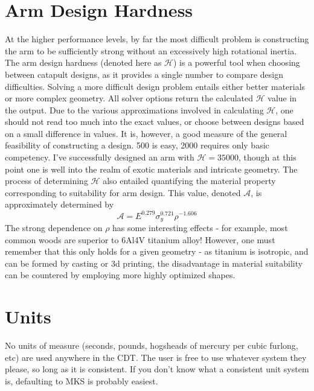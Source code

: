 \documentclass{article}
\begin{document}
\section{Arm Design Hardness}
 At the higher performance levels, by far the most difficult problem is constructing the arm to be sufficiently strong without an excessively high rotational inertia. The arm design hardness (denoted here as $\mathcal{H}$) is a powerful tool when choosing between catapult designs, as it provides a single number to compare design difficulties. Solving a more difficult design problem entails either better materials or more complex geometry. All solver options return the calculated $\mathcal{H}$ value in the output. Due to the various approximations involved in calculating $\mathcal{H}$, one should not read too much into the exact values, or choose between designs based on a small difference in values. It is, however, a good measure of the general feasibility of constructing a design. 500 is easy, 2000 requires only basic competency. I've successfully designed an arm with $\mathcal{H}=35000$, though at this point one is well into the realm of exotic materials and intricate geometry. The process of determining $\mathcal{H}$ also entailed quantifying the material property corresponding to suitability for arm design. This value, denoted $\mathcal{A}$, is approximately determined by
 \[\mathcal{A} = E^{0.279} \sigma_y^{0.721} \rho^{-1.606}\]
 The strong dependence on $\rho$ has some interesting effects - for example, most common woods are superior to 6Al4V titanium alloy! However, one must remember that this only holds for a given geometry - as titanium is isotropic, and can be formed by casting or 3d printing, the disadvantage in material suitability can be countered by employing more highly optimized shapes.

\section{Units}
No units of measure (seconds, pounds, hogsheads of mercury per cubic furlong, etc) are used anywhere in the CDT. The user is free to use whatever system they please, so long as it is consistent. If you don't know what a consistent unit system is, defaulting to MKS is probably easiest.
\end{document}
